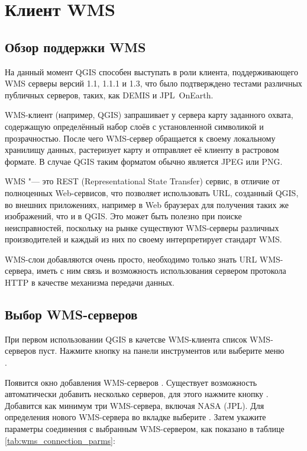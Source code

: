 \section{Клиент WMS}\label{sec:ogc-wms}

\subsection{Обзор поддержки
WMS}\label{sec:ogc-wms-about}

На данный момент QGIS способен выступать в роли клиента, поддерживающего WMS
серверы версий 1.1, 1.1.1 и 1.3, что было подтверждено тестами различных
публичных серверов, таких, как DEMIS и JPL~OnEarth.

WMS-клиент (например, QGIS) запрашивает у сервера карту заданного
охвата, содержащую определённый набор слоёв с установленной символикой и
прозрачностью. После чего WMS-сервер обращается к своему локальному хранилищу
данных, растеризует карту и отправляет её клиенту в растровом формате. В
случае QGIS таким форматом обычно является JPEG или PNG.

WMS "--- это REST (Representational State Transfer) сервис, в отличие от
полноценных Web-сервисов, что позволяет использовать URL, созданный QGIS,
во внешних приложениях, например в Web браузерах для получения таких же
изображений, что и в QGIS. Это может быть полезно при поиске неисправностей,
поскольку на рынке существуют WMS-серверы различных производителей и каждый
из них по своему интерпретирует стандарт WMS.

WMS-слои добавляются очень просто, необходимо только знать URL WMS-сервера,
иметь с ним связь и возможность использования сервером протокола HTTP в
качестве механизма передачи данных.

\subsection{Выбор WMS-серверов}\label{sec:ogc-wms-servers}

При первом использовании QGIS в качетсве WMS-клиента список WMS-серверов пуст.
Нажмите кнопку  на панели
инструментов или выберите меню  \arrow \\
.

Появится окно добавления WMS-серверов .
Существует возможность автоматически добавить несколько серверов, для
этого нажмите кнопку . Добавится как минимум три
WMS-сервера, включая NASA (JPL). Для определения нового WMS-сервера
во вкладке  выберите . Затем укажите
параметры соединения с выбранным WMS-сервером, как показано в таблице
\ref{tab:wms_connection_parms}:

